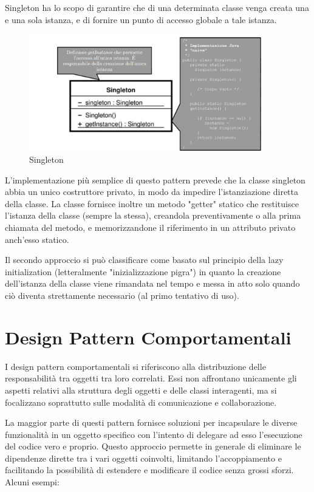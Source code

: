 Singleton ha lo scopo di garantire che di una determinata classe venga creata una e una sola istanza, e di fornire un punto di accesso globale a tale istanza.

\begin{figure}[H]
\includegraphics[width=0.9\textwidth]{res/img/DP/singleton}
\caption{Singleton}
\end{figure}

L'implementazione più semplice di questo pattern prevede che la classe singleton abbia un unico costruttore privato, in modo da impedire l'istanziazione diretta della classe. 
La classe fornisce inoltre un metodo "getter" statico che restituisce l'istanza della classe (sempre la stessa), creandola preventivamente o alla prima chiamata del metodo, e memorizzandone il riferimento in un attributo privato anch'esso statico. 

Il secondo approccio si può classificare come basato sul principio della lazy initialization (letteralmente "inizializzazione pigra") in quanto la creazione dell'istanza della classe viene rimandata nel tempo e messa in atto solo quando ciò diventa strettamente necessario (al primo tentativo di uso).

\section{Design Pattern Comportamentali}
I design pattern comportamentali si riferiscono alla distribuzione delle responsabilità tra oggetti tra loro correlati. 
Essi non affrontano unicamente gli aspetti relativi alla struttura degli oggetti e delle classi interagenti, ma si focalizzano soprattutto sulle modalità di comunicazione e collaborazione.

La maggior parte di questi pattern fornisce soluzioni per incapsulare le diverse funzionalità in un oggetto specifico con l'intento di delegare ad esso l'esecuzione del codice vero e proprio. Questo approccio permette in generale di eliminare le dipendenze dirette tra i vari oggetti coinvolti, limitando l'accoppiamento e facilitando la possibilità di estendere e modificare il codice senza grossi sforzi.
Alcuni esempi:

